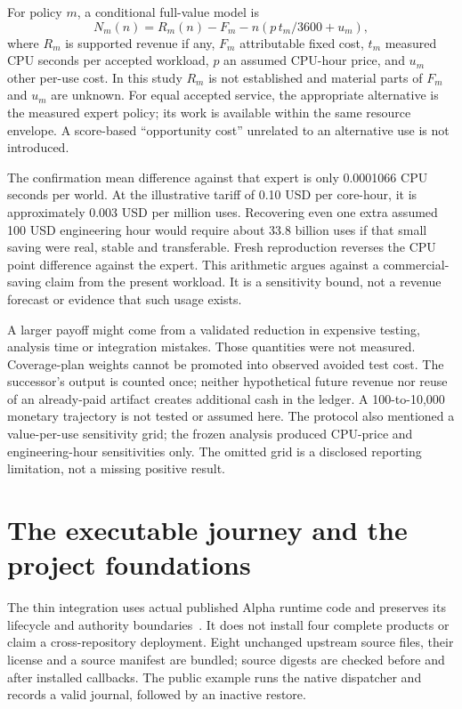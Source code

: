 \documentclass[11pt,letterpaper]{article}
\begin{document}
For policy $m$, a conditional full-value model is
\begin{equation}
 N_m(n)=R_m(n)-F_m-n\left(p\,t_m/3600+u_m\right),
 \label{eq:value}
\end{equation}
where $R_m$ is supported revenue if any, $F_m$ attributable fixed cost, $t_m$ measured CPU seconds per accepted workload, $p$ an assumed CPU-hour price, and $u_m$ other per-use cost. In this study $R_m$ is not established and material parts of $F_m$ and $u_m$ are unknown. For equal accepted service, the appropriate alternative is the measured expert policy; its work is available within the same resource envelope. A score-based ``opportunity cost'' unrelated to an alternative use is not introduced.

The confirmation mean difference against that expert is only 0.0001066 CPU seconds per world. At the illustrative tariff of 0.10 USD per core-hour, it is approximately 0.003 USD per million uses. Recovering even one extra assumed 100 USD engineering hour would require about 33.8 billion uses if that small saving were real, stable and transferable. Fresh reproduction reverses the CPU point difference against the expert. This arithmetic argues against a commercial-saving claim from the present workload. It is a sensitivity bound, not a revenue forecast or evidence that such usage exists.

A larger payoff might come from a validated reduction in expensive testing, analysis time or integration mistakes. Those quantities were not measured. Coverage-plan weights cannot be promoted into observed avoided test cost. The successor's output is counted once; neither hypothetical future revenue nor reuse of an already-paid artifact creates additional cash in the ledger. A 100-to-10,000 monetary trajectory is not tested or assumed here. The protocol also mentioned a value-per-use sensitivity grid; the frozen analysis produced CPU-price and engineering-hour sensitivities only. The omitted grid is a disclosed reporting limitation, not a missing positive result.

\FloatBarrier
\section{The executable journey and the project foundations}
\label{sec:architecture}
The thin integration uses actual published Alpha runtime code and preserves its lifecycle and authority boundaries~\cite{montrealai2026alpha,montrealai2026successorarchitecture,montrealai2026successorprotocol}. It does not install four complete products or claim a cross-repository deployment. Eight unchanged upstream source files, their license and a source manifest are bundled; source digests are checked before and after installed callbacks. The public example runs the native dispatcher and records a valid journal, followed by an inactive restore.
\end{document}
